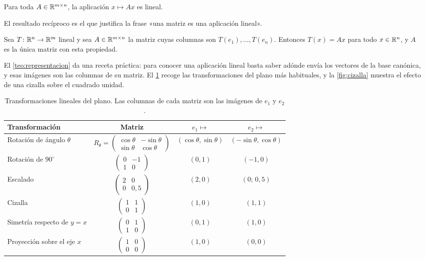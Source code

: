 \begin{proposicion}\label{prop:matriz-lineal}
Para toda $A\in\mathbb{R}^{m\times n}$, la aplicación $x\mapsto Ax$ es lineal.
\end{proposicion}

El resultado recíproco es el que justifica la frase «una matriz es una aplicación lineal».

\begin{teorema}\label{teo:representacion}
Sea $T\colon\mathbb{R}^{n}\to\mathbb{R}^{m}$ lineal y sea $A\in\mathbb{R}^{m\times n}$ la matriz cuyas columnas son $T(e_1),\dots,T(e_n)$. Entonces $T(x)=Ax$ para todo $x\in\mathbb{R}^{n}$, y $A$ es la única matriz con esta propiedad.
\end{teorema}

El \cref{teo:representacion} da una receta práctica: para conocer una aplicación lineal basta saber adónde envía los vectores de la base canónica, y esas imágenes son las columnas de su matriz. El \cref{tab:transformaciones} recoge las transformaciones del plano más habituales, y la \cref{fig:cizalla} muestra el efecto de una cizalla sobre el cuadrado unidad.

\begin{table}[h]
\centering\small
\caption{Transformaciones lineales del plano. Las columnas de cada matriz son las imágenes de $e_1$ y $e_2$.}\label{tab:transformaciones}
\begin{tabular}{@{}lccc@{}}
\toprule
Transformación & Matriz & $e_1\mapsto$ & $e_2\mapsto$ \\
\midrule
Rotación de ángulo $\theta$ & $R_\theta=\begin{pmatrix}\cos\theta&-\sin\theta\\ \sin\theta&\cos\theta\end{pmatrix}$ & $(\cos\theta,\sin\theta)$ & $(-\sin\theta,\cos\theta)$ \\[10pt]
Rotación de $90^\circ$ & $\begin{pmatrix}0&-1\\1&0\end{pmatrix}$ & $(0,1)$ & $(-1,0)$ \\[8pt]
Escalado & $\begin{pmatrix}2&0\\0&0{,}5\end{pmatrix}$ & $(2,0)$ & $(0;\,0{,}5)$ \\[8pt]
Cizalla & $\begin{pmatrix}1&1\\0&1\end{pmatrix}$ & $(1,0)$ & $(1,1)$ \\[8pt]
Simetría respecto de $y=x$ & $\begin{pmatrix}0&1\\1&0\end{pmatrix}$ & $(0,1)$ & $(1,0)$ \\[8pt]
Proyección sobre el eje $x$ & $\begin{pmatrix}1&0\\0&0\end{pmatrix}$ & $(1,0)$ & $(0,0)$ \\
\bottomrule
\end{tabular}
\end{table}

